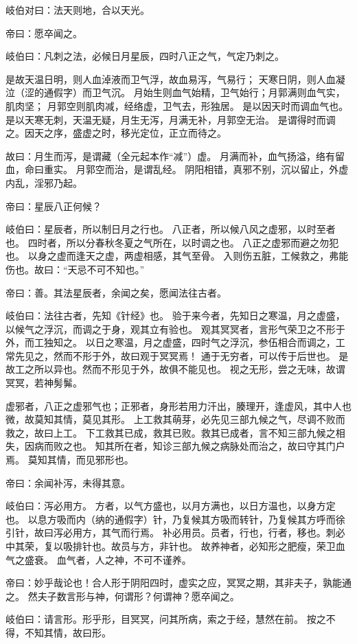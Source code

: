 \documentclass{article}%
\begin{document}
岐伯对曰：法天则地，合以天光。

帝曰：愿卒闻之。

岐伯曰：凡刺之法，必候日月星辰，四时八正之气，气定乃刺之。

是故天温日明，则人血淖液而卫气浮，故血易泻，气易行；
天寒日阴，则人血凝泣（涩的通假字）而卫气沉。
月始生则血气始精，卫气始行；月郭满则血气实，肌肉坚；
月郭空则肌肉减，经络虚，卫气去，形独居。
是以因天时而调血气也。是以天寒无刺，天温无疑，月生无泻，月满无补，月郭空无治。
是谓得时而调之。因天之序，盛虚之时，移光定位，正立而待之。

故曰：月生而泻，是谓藏（全元起本作“减”）虚。
月满而补，血气扬溢，络有留血，命曰重实。
月郭空而治，是谓乱经。
阴阳相错，真邪不别，沉以留止，外虚内乱，淫邪乃起。

帝曰：星辰八正何候？

岐伯曰：星辰者，所以制日月之行也。
八正者，所以候八风之虚邪，以时至者也。
四时者，所以分春秋冬夏之气所在，以时调之也。
八正之虚邪而避之勿犯也。
以身之虚而逢天之虚，两虚相感，其气至骨。
入则伤五脏，工候救之，弗能伤也。故曰：“天忌不可不知也。”

帝曰：善。其法星辰者，余闻之矣，愿闻法往古者。

岐伯曰：法往古者，先知《针经》也。
验于来今者，先知日之寒温，月之虚盛，以候气之浮沉，而调之于身，观其立有验也。
观其冥冥者，言形气荣卫之不形于外，而工独知之。
以日之寒温，月之虚盛，四时气之浮沉，参伍相合而调之，工常先见之，然而不形于外，故曰观于冥冥焉！
通于无穷者，可以传于后世也。
是故工之所以异也。然而不形见于外，故俱不能见也。
视之无形，尝之无味，故谓冥冥，若神髣髴。

虚邪者，八正之虚邪气也；正邪者，身形若用力汗出，腠理开，逢虚风，其中人也微，故莫知其情，莫见其形。
上工救其萌芽，必先见三部九候之气，尽调不败而救之，故曰上工。
下工救其已成，救其已败。救其已成者，言不知三部九候之相失，因病而败之也。
知其所在者，知诊三部九候之病脉处而治之，故曰守其门户焉。
莫知其情，而见邪形也。

帝曰：余闻补泻，未得其意。

岐伯曰：泻必用方。
方者，以气方盛也，以月方满也，以日方温也，以身方定也。
以息方吸而内（纳的通假字）针，乃复候其方吸而转针，乃复候其方呼而徐引针，故曰泻必用方，其气而行焉。
补必用员。员者，行也，行者，移也。刺必中其荣，复以吸排针也。故员与方，非针也。
故养神者，必知形之肥瘦，荣卫血气之盛衰。
血气者，人之神，不可不谨养。

帝曰：妙乎哉论也！合人形于阴阳四时，虚实之应，冥冥之期，其非夫子，孰能通之。
然夫子数言形与神，何谓形？何谓神？愿卒闻之。

岐伯曰：请言形。形乎形，目冥冥，问其所病，索之于经，慧然在前。
按之不得，不知其情，故曰形。
\end{document}
